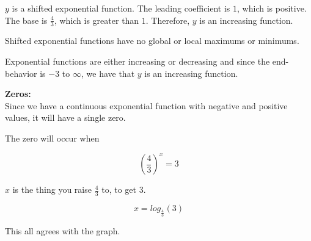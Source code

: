 \documentclass{ximera}
\begin{document}
\begin{exercise}
$y$ is a shifted exponential function. The leading coefficient is $1$, which is positive.  The base is $\frac{4}{3}$, which is greater than $1$.  Therefore, $y$ is an increasing function.

Shifted exponential functions have no global or local maximums or minimums.


Exponential functions are either increasing or decreasing and since the end-behavior is $-3$ to $\infty$, we have that $y$ is an increasing function.




\textbf{\textcolor{blue!55!black}{Zeros:}}  \\


Since we have a continuous exponential function with negative and positive values, it will have a single zero.


The zero will occur when 

\[
\left(\frac{4}{3}\right)^x = 3
\]

$x$ is the thing you raise $\frac{4}{3}$ to, to get $3$.

\[
x = log_{\tfrac{4}{3}}(3)
\]




This all agrees with the graph.


\begin{image}
\end{image}















\end{exercise}
\end{document}
